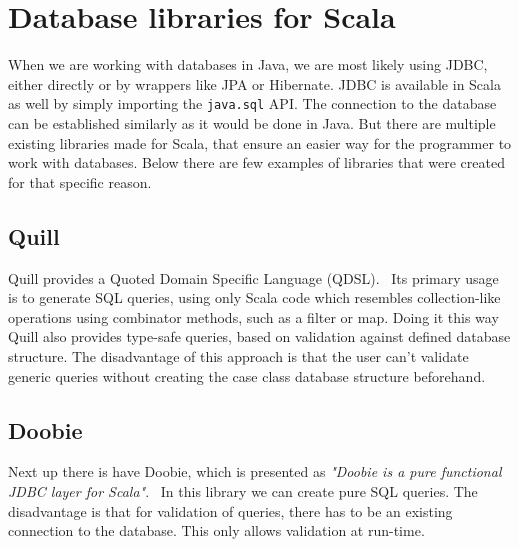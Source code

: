 \section{Database libraries for Scala}
When we are working with databases in Java, we are most likely using JDBC, either directly or by wrappers like JPA or Hibernate. JDBC is available in Scala as well by simply importing the \texttt{java.sql} API. The connection to the database can be established similarly as it would be done in Java. But there are multiple existing libraries made for Scala, that ensure an easier way for the programmer to work with databases. Below there are few examples of libraries that were created for that specific reason.


\subsection{Quill}
Quill provides a Quoted Domain Specific Language (QDSL).~\cite{Quill} Its primary usage is to generate SQL queries, using only Scala code which resembles collection-like operations using combinator methods, such as a filter or map. Doing it this way Quill also provides type-safe queries, based on validation against defined database structure. The disadvantage of this approach is that the user can't validate generic queries without creating the case class database structure beforehand.

\subsection{Doobie}
Next up there is have Doobie, which is presented as \textit{"Doobie is a pure functional JDBC layer for Scala"}.~\cite{Doobie} In this library we can create pure SQL queries. The disadvantage is that for validation of queries, there has to be an existing connection to the database. This only allows validation at run-time.